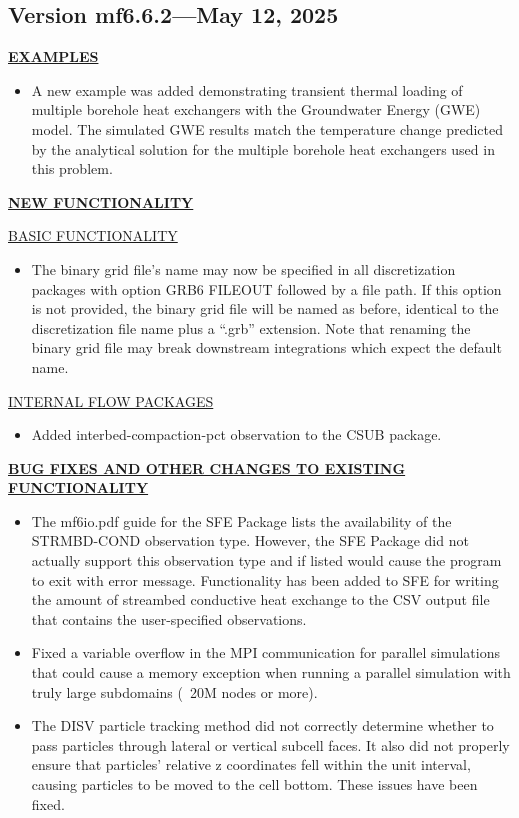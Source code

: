 \subsection{Version mf6.6.2---May 12, 2025}

\textbf{\underline{EXAMPLES}}
\begin{itemize}
\item A new example was added demonstrating transient thermal loading of multiple borehole heat exchangers with the Groundwater Energy (GWE) model. The simulated GWE results match the temperature change predicted by the analytical solution for the multiple borehole heat exchangers used in this problem.
\end{itemize}

\textbf{\underline{NEW FUNCTIONALITY}}

\underline{BASIC FUNCTIONALITY}
\begin{itemize}
\item The binary grid file's name may now be specified in all discretization packages with option GRB6 FILEOUT followed by a file path. If this option is not provided, the binary grid file will be named as before, identical to the discretization file name plus a ``.grb'' extension. Note that renaming the binary grid file may break downstream integrations which expect the default name.
\end{itemize}

\underline{INTERNAL FLOW PACKAGES}
\begin{itemize}
\item Added interbed-compaction-pct observation to the CSUB package.
\end{itemize}

\textbf{\underline{BUG FIXES AND OTHER CHANGES TO EXISTING FUNCTIONALITY}}
\begin{itemize}
\item The mf6io.pdf guide for the SFE Package lists the availability of the STRMBD-COND observation type.  However, the SFE Package did not actually support this observation type and if listed would cause the program to exit with error message.  Functionality has been added to SFE for writing the amount of streambed conductive heat exchange to the CSV output file that contains the user-specified observations.
\item Fixed a variable overflow in the MPI communication for parallel simulations that could cause a memory exception when running a parallel simulation with truly large subdomains (~20M nodes or more).
\item The DISV particle tracking method did not correctly determine whether to pass particles through lateral or vertical subcell faces. It also did not properly ensure that particles' relative z coordinates fell within the unit interval, causing particles to be moved to the cell bottom. These issues have been fixed.
\end{itemize}
